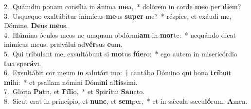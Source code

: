 {2.~}Quámdiu ponam consília in \textbf{á}nima \textbf{me}a,~* dolórem in corde \textbf{me}o per \textbf{di}em?\\
{3.~}Usquequo exaltábitur inimícus \textbf{me}us \textbf{su}\textbf{per} me?~* réspice, et exáudi me, Dómine, \textbf{De}us \textbf{me}us.\\
{4.~}Illúmina óculos meos ne umquam obdórmi\textbf{am} in \textbf{mor}te:~* nequándo dicat inimícus meus: præválui ad\textbf{vér}sus \textbf{e}um.\\
{5.~}Qui tríbulant me, exsultábunt si \textbf{mo}tus \textbf{fú}\textbf{e}ro:~* ego autem in misericórdia \textbf{tu}a spe\textbf{rá}vi.\\
{6.~}Exsultábit cor meum in salutári tuo:~† cantábo Dómino qui bona \textbf{trí}buit \textbf{mi}hi:~* et psallam nómini Dómi\textbf{ni} al\textbf{tís}simi.\\
{7.~}Glória \textbf{Pa}tri, et \textbf{Fí}\textbf{li}o,~* et Spi\textbf{rí}tui \textbf{San}cto.\\
{8.~}Sicut erat in princípio, et \textbf{nunc}, et \textbf{sem}per,~* et in sǽcula sæcu\textbf{ló}rum. \textbf{A}men.\\
